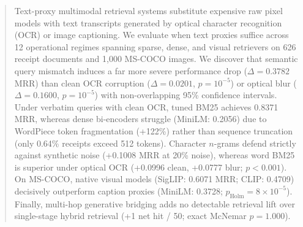 \begin{abstract}
Text-proxy multimodal retrieval systems substitute expensive raw pixel models with text transcripts generated by optical character recognition (OCR) or image captioning. We evaluate when text proxies suffice across 12 operational regimes spanning sparse, dense, and visual retrievers on 626 receipt documents and 1,000 MS-COCO images.
We discover that semantic query mismatch induces a far more severe performance drop ($\Delta = 0.3782$ MRR) than clean OCR corruption ($\Delta = 0.0201$, $p = 10^{-5}$) or optical blur ($\Delta = 0.1600$, $p = 10^{-5}$) with non-overlapping 95\% confidence intervals.
Under verbatim queries with clean OCR, tuned BM25 achieves 0.8371 MRR, whereas dense bi-encoders struggle (MiniLM: 0.2056) due to WordPiece token fragmentation (+122\%) rather than sequence truncation (only 0.64\% receipts exceed 512 tokens).
Character $n$-grams defend strictly against synthetic noise (+0.1008 MRR at 20\% noise), whereas word BM25 is superior under optical OCR (+0.0996 clean, +0.0777 blur; $p < 0.001$).
On MS-COCO, native visual models (SigLIP: 0.6071 MRR; CLIP: 0.4709) decisively outperform caption proxies (MiniLM: 0.3728; $p_{\text{Holm}} = 8 \times 10^{-5}$).
Finally, multi-hop generative bridging adds no detectable retrieval lift over single-stage hybrid retrieval (+1 net hit / 50; exact McNemar $p = 1.000$).
\end{abstract}
